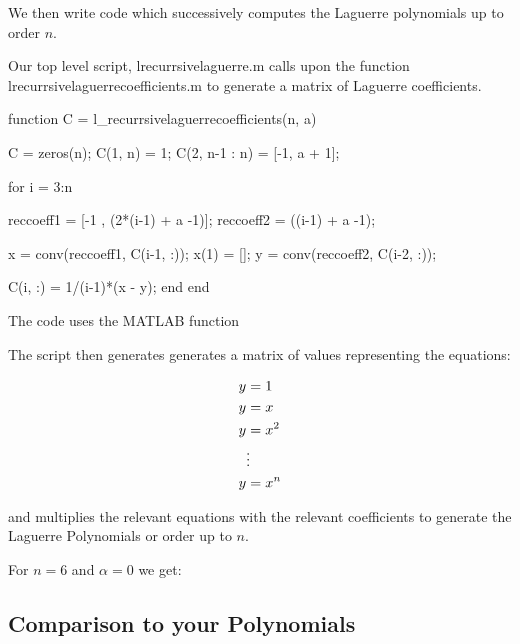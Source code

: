 \documentclass{article}
\begin{document}
We then write code which successively computes the Laguerre polynomials up to order $ n $.

Our top level script, l\textunderscore recurrsivelaguerre.m calls upon the function l\textunderscore recurrsivelaguerrecoefficients.m to generate a matrix of Laguerre coefficients.  

\begin{code}

function C = l_recurrsivelaguerrecoefficients(n, a)

    C = zeros(n);
    C(1, n) = 1;
    C(2, n-1 : n) = [-1, a + 1];

    for i = 3:n
        
        reccoeff1 = [-1 , (2*(i-1) + a -1)];
        reccoeff2 = ((i-1) + a -1);
        
        x = conv(reccoeff1, C(i-1, :));
        x(1) = [];          %
        y = conv(reccoeff2, C(i-2, :));
        
        C(i, :) = 1/(i-1)*(x - y);
    end
end
\end{code}

The code uses the MATLAB function %

The script then generates generates a matrix of values representing the equations:

$$
\begin{aligned}
y &= 1 \\
y &= x \\
y &= x^2 \\
&\vdots \\
y &= x^n
\end{aligned} \\
$$

and multiplies the relevant equations with the relevant coefficients to generate the Laguerre Polynomials or order up to $ n $.

For $ n = 6 $ and $ \alpha = 0 $ we get:


\subsection{Comparison to your Polynomials}
\end{document}
